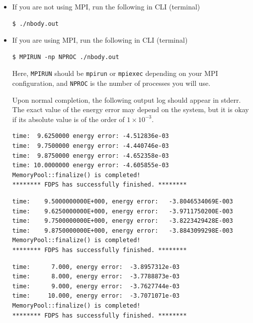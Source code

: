 \begin{itemize}
\item If you are not using MPI, run the following in CLI (terminal)
\begin{screen}
\begin{verbatim}
$ ./nbody.out
\end{verbatim}
\end{screen}
  
\item If you are using MPI, run the following in CLI (terminal)
\begin{screen}
\begin{verbatim}
$ MPIRUN -np NPROC ./nbody.out
\end{verbatim}
\end{screen}
Here, \texttt{MPIRUN} should be \texttt{mpirun} or \texttt{mpiexec} depending on your MPI configuration, and \texttt{NPROC} is the number of processes you will use.

Upon normal completion, the following output log should appear in stderr. The exact value of the energy error may depend on the system, but it is okay if its absolute value is of the order of $1 \times 10^{-3}$.
\ifCpp %
\begin{screen}
\begin{verbatim}
time:  9.6250000 energy error: -4.512836e-03
time:  9.7500000 energy error: -4.440746e-03
time:  9.8750000 energy error: -4.652358e-03
time: 10.0000000 energy error: -4.605855e-03
MemoryPool::finalize() is completed!
******** FDPS has successfully finished. ********
\end{verbatim}
\end{screen}
\endifCpp
\ifFtn %
\begin{screen}
\begin{verbatim}
time:    9.5000000000E+000, energy error:   -3.8046534069E-003
time:    9.6250000000E+000, energy error:   -3.9711750200E-003
time:    9.7500000000E+000, energy error:   -3.8223429428E-003
time:    9.8750000000E+000, energy error:   -3.8843099298E-003
MemoryPool::finalize() is completed!
******** FDPS has successfully finished. ********
\end{verbatim}
\end{screen}
\endifFtn
\ifC %
\begin{screen}
\begin{verbatim}
time:      7.000, energy error:  -3.8957312e-03
time:      8.000, energy error:  -3.7788873e-03
time:      9.000, energy error:  -3.7627744e-03
time:     10.000, energy error:  -3.7071071e-03
MemoryPool::finalize() is completed!
******** FDPS has successfully finished. ********
\end{verbatim}
\end{screen}
\endifC
\end{itemize}

